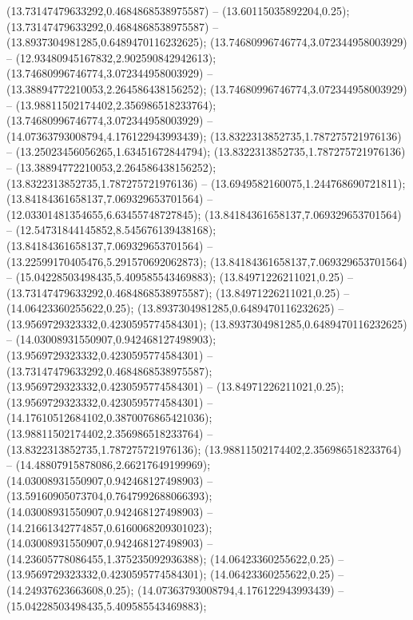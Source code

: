  (13.73147479633292,0.4684868538975587) -- (13.60115035892204,0.25);
 (13.73147479633292,0.4684868538975587) -- (13.8937304981285,0.6489470116232625);
 (13.74680996746774,3.072344958003929) -- (12.93480945167832,2.902590842942613);
 (13.74680996746774,3.072344958003929) -- (13.38894772210053,2.264586438156252);
 (13.74680996746774,3.072344958003929) -- (13.98811502174402,2.356986518233764);
 (13.74680996746774,3.072344958003929) -- (14.07363793008794,4.176122943993439);
 (13.8322313852735,1.787275721976136) -- (13.25023456056265,1.63451672844794);
 (13.8322313852735,1.787275721976136) -- (13.38894772210053,2.264586438156252);
 (13.8322313852735,1.787275721976136) -- (13.6949582160075,1.244768690721811);
 (13.84184361658137,7.069329653701564) -- (12.03301481354655,6.63455748727845);
 (13.84184361658137,7.069329653701564) -- (12.54731844145852,8.545676139438168);
 (13.84184361658137,7.069329653701564) -- (13.22599170405476,5.291570692062873);
 (13.84184361658137,7.069329653701564) -- (15.04228503498435,5.409585543469883);
 (13.84971226211021,0.25) -- (13.73147479633292,0.4684868538975587);
 (13.84971226211021,0.25) -- (14.06423360255622,0.25);
 (13.8937304981285,0.6489470116232625) -- (13.9569729323332,0.4230595774584301);
 (13.8937304981285,0.6489470116232625) -- (14.03008931550907,0.942468127498903);
 (13.9569729323332,0.4230595774584301) -- (13.73147479633292,0.4684868538975587);
 (13.9569729323332,0.4230595774584301) -- (13.84971226211021,0.25);
 (13.9569729323332,0.4230595774584301) -- (14.17610512684102,0.3870076865421036);
 (13.98811502174402,2.356986518233764) -- (13.8322313852735,1.787275721976136);
 (13.98811502174402,2.356986518233764) -- (14.48807915878086,2.66217649199969);
 (14.03008931550907,0.942468127498903) -- (13.59160905073704,0.7647992688066393);
 (14.03008931550907,0.942468127498903) -- (14.21661342774857,0.6160068209301023);
 (14.03008931550907,0.942468127498903) -- (14.23605778086455,1.375235092936388);
 (14.06423360255622,0.25) -- (13.9569729323332,0.4230595774584301);
 (14.06423360255622,0.25) -- (14.24937623663608,0.25);
 (14.07363793008794,4.176122943993439) -- (15.04228503498435,5.409585543469883);
